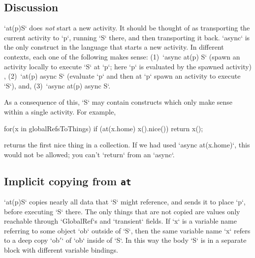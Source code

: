 




\subsection{Discussion}
\xcd`at(p)S` does {\em not} start a new activity.  It should be thought of as
transporting the current activity to \xcd`p`, running \xcd`S` there, and then
transporting it back.  \xcd`async` is the only construct in the
language that starts a new activity. In different contexts, each one
of the following makes sense:
(1)~\xcd`async at(p) S` (spawn an activity locally to execute \xcd`S` at
\xcd`p`; here \xcd`p` is evaluated by the spawned activity) , 
(2)~\xcd`at(p) async S` (evaluate \xcd`p` and then at \xcd`p` spawn an
activity to execute \xcd`S`), and,
(3)~\xcd`async at(p) async S`. 

As a consequence of this, \xcd`S` may contain constructs which only make sense
within a single activity.  
For example, 
\begin{xten}
    for(x in globalRefsToThings) 
      if (at(x.home) x().nice()) 
        return x();
\end{xten}
returns the first nice thing in a collection.   If we had used 
\xcd`async at(x.home)`, this would not be allowed; 
you can't \xcd`return` from an
\xcd`async`. 

\subsection{Implicit copying from {\tt at} }

\xcd`at(p)S` copies nearly all data that \xcd`S` might reference, and sends it
to place \xcd`p`, before executing \xcd`S` there. The only things that are not
copied are values only reachable through \xcd`GlobalRef`s and \xcd`transient`
fields.    If \xcd`x` is a
variable name referring to some object \xcd`ob` outside of \xcd`S`, then the
same variable name \xcd`x` refers to a deep copy \xcd`ob{$'$}` of \xcd`ob`
inside of \xcd`S`.  In this way the body \xcd`S` is in a separate block with
different variable bindings.

